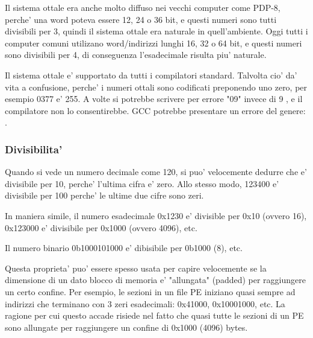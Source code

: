 Il sistema ottale era anche molto diffuso nei vecchi computer come PDP-8, perche' una word poteva essere 12, 24 o 36 bit, e questi numeri sono tutti divisibili per 3, quindi il sistema ottale era naturale in quell'ambiente.
Oggi tutti i computer comuni utilizano word/indirizzi lunghi 16, 32 o 64 bit, e questi numeri sono divisibili per 4, di conseguenza l'esadecimale risulta piu' naturale.

Il sistema ottale e' supportato da tutti i compilatori \CCpp standard.
Talvolta cio' da' vita a confusione, perche' i numeri ottali sono codificati preponendo uno zero, per esempio 0377 e' 255.
A volte si potrebbe scrivere per errore "09" invece di 9 , e il compilatore non lo consentirebbe.
GCC potrebbe presentare un errore del genere:\\
.

\subsubsection{Divisibilita'}

Quando si vede un numero decimale come 120, si puo' velocemente dedurre che e' divisibile per 10, perche' l'ultima cifra e' zero.
Allo stesso modo, 123400 e' divisibile per 100 perche' le ultime due cifre sono zeri.


In maniera simile, il numero esadecimale 0x1230 e' divisible per 0x10 (ovvero 16), 0x123000 e' divisibile per 0x1000 (ovvero 4096), etc.

Il numero binario 0b1000101000 e' dibisibile per 0b1000 (8), etc.

Questa proprieta' puo' essere spesso usata per capire velocemente se la dimensione di un dato blocco di memoria e' "allungata" (padded) per raggiungere un certo confine.
Per esempio, le sezioni in un file \ac{PE} iniziano quasi sempre ad indirizzi che terminano con 3 zeri esadecimali: 0x41000, 0x10001000, etc.
La ragione per cui questo accade risiede nel fatto che quasi tutte le sezioni di un \ac{PE} sono allungate per raggiungere un confine di 0x1000 (4096) bytes.

